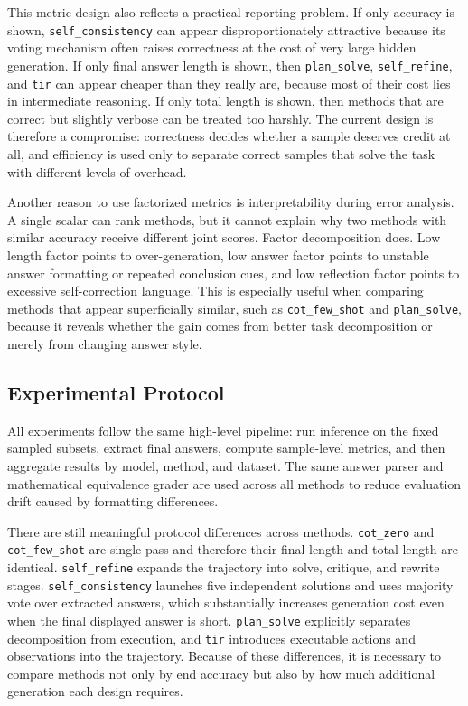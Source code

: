\documentclass[conference]{IEEEtran}
\begin{document}
This metric design also reflects a practical reporting problem. If only accuracy is shown, \texttt{self\_consistency} can appear disproportionately attractive because its voting mechanism often raises correctness at the cost of very large hidden generation. If only final answer length is shown, then \texttt{plan\_solve}, \texttt{self\_refine}, and \texttt{tir} can appear cheaper than they really are, because most of their cost lies in intermediate reasoning. If only total length is shown, then methods that are correct but slightly verbose can be treated too harshly. The current design is therefore a compromise: correctness decides whether a sample deserves credit at all, and efficiency is used only to separate correct samples that solve the task with different levels of overhead.

Another reason to use factorized metrics is interpretability during error analysis. A single scalar can rank methods, but it cannot explain why two methods with similar accuracy receive different joint scores. Factor decomposition does. Low length factor points to over-generation, low answer factor points to unstable answer formatting or repeated conclusion cues, and low reflection factor points to excessive self-correction language. This is especially useful when comparing methods that appear superficially similar, such as \texttt{cot\_few\_shot} and \texttt{plan\_solve}, because it reveals whether the gain comes from better task decomposition or merely from changing answer style.

\subsection{Experimental Protocol}
All experiments follow the same high-level pipeline: run inference on the fixed sampled subsets, extract final answers, compute sample-level metrics, and then aggregate results by model, method, and dataset. The same answer parser and mathematical equivalence grader are used across all methods to reduce evaluation drift caused by formatting differences.

There are still meaningful protocol differences across methods. \texttt{cot\_zero} and \texttt{cot\_few\_shot} are single-pass and therefore their final length and total length are identical. \texttt{self\_refine} expands the trajectory into solve, critique, and rewrite stages. \texttt{self\_consistency} launches five independent solutions and uses majority vote over extracted answers, which substantially increases generation cost even when the final displayed answer is short. \texttt{plan\_solve} explicitly separates decomposition from execution, and \texttt{tir} introduces executable actions and observations into the trajectory. Because of these differences, it is necessary to compare methods not only by end accuracy but also by how much additional generation each design requires.
\end{document}
